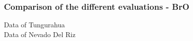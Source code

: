 \documentclass[aspectratio=169]{beamer} %
\begin{document}
		\begin{frame}
			\frametitle{\color{mygreen}Comparison of the different evaluations - BrO\\%
				\color{mygreen}{\rule{0.8\textwidth}{2pt}}}
			\begin{figure}[h!]	
			\end{figure}
		\vspace{-0.7cm}
\begin{multicols}{2}
	\centering
	Data of Tungurahua\\
	Data of Nevado Del Riz

\end{multicols}
		\end{frame}
		
\end{document}
